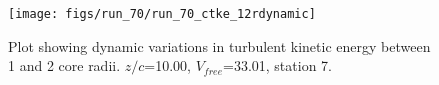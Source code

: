 \begin{figure}[H]
\centering
\texttt{[image: figs/run\_70/run\_70\_ctke\_12rdynamic]}
\caption{Plot showing dynamic variations in turbulent kinetic energy between 1 and 2 core radii. $z/c$=10.00, $V_{free}$=33.01, station 7.}
\label{fig:run_70_ctke_12rdynamic}
\end{figure}


